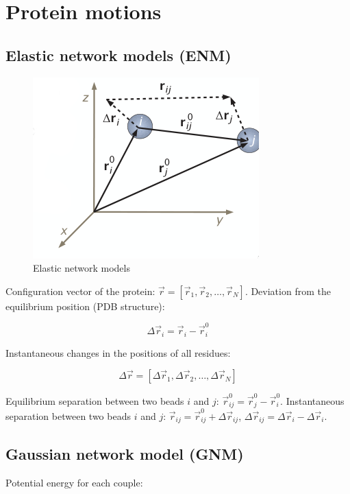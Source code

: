 \graphicspath{{chapters/15/images/}}
\chapter{Protein motions}

\section{Elastic network models (ENM)}

\begin{figure}[H]
	\includegraphics[width=\textwidth]{enm-theory}
	\caption{Elastic network models}
	\label{fig:kirchhoff-adjacency}
\end{figure}

Configuration vector of the protein: $\vec{r} = [\vec{r}_1, \vec{r}_2, \dots, \vec{r}_N]$.
Deviation from the equilibrium position (PDB structure):

$$\Delta\vec{r}_i = \vec{r}_i-\vec{r}_i^0$$

Instantaneous changes in the positions of all residues:

$$\Delta\vec{r} = [\Delta\vec{r}_1, \Delta\vec{r}_2, \dots, \Delta\vec{r}_N]$$


Equilibrium separation between two beads $i$ and $j$: $\vec{r}_{ij}^0 = \vec{r}_j^0-\vec{r}_i^0$.
Instantaneous separation between two beads $i$ and $j$: $\vec{r}_{ij} = \vec{r}_{ij}^0+\Delta\vec{r}_{ij}$, $\Delta\vec{r}_{ij} = \Delta\vec{r}_i-\Delta\vec{r}_i$.

\section{Gaussian network model (GNM)}
Potential energy for each couple:

